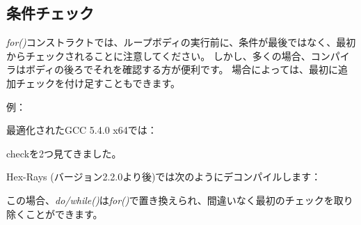 ﻿\subsection{条件チェック}

\emph{for()}コンストラクトでは、ループボディの実行前に、条件が最後ではなく、最初からチェックされることに注意してください。 
しかし、多くの場合、コンパイラはボディの後ろでそれを確認する方が便利です。 
場合によっては、最初に追加チェックを付け足すこともできます。

例：



最適化されたGCC 5.4.0 x64では：



checkを2つ見てきました。

Hex-Rays (バージョン2.2.0より後)では次のようにデコンパイルします：



この場合、\emph{do/while()}は\emph{for()}で置き換えられ、間違いなく最初のチェックを取り除くことができます。
